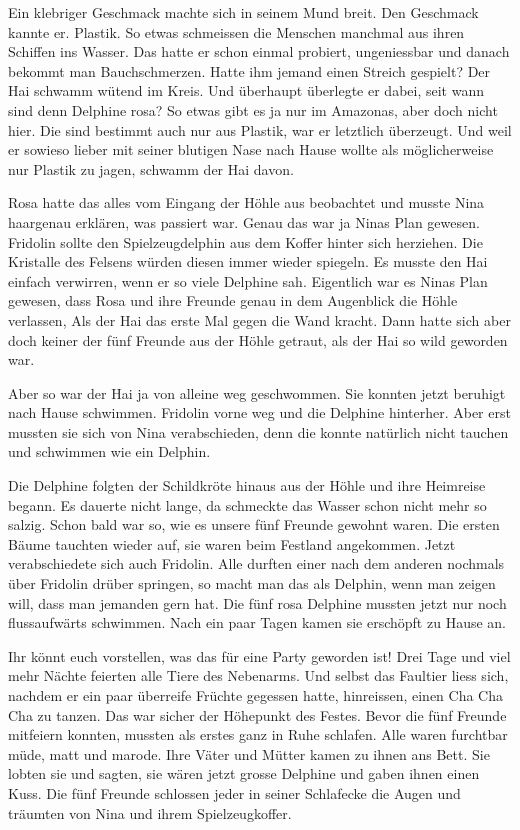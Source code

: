 Ein klebriger Geschmack machte sich in seinem Mund breit. Den Geschmack kannte er. Plastik. So etwas schmeissen die Menschen manchmal aus ihren Schiffen ins Wasser. Das hatte er schon einmal probiert, ungeniessbar und danach bekommt man Bauchschmerzen. Hatte ihm jemand einen Streich gespielt? Der Hai schwamm wütend im Kreis. Und überhaupt überlegte er dabei, seit wann sind denn Delphine rosa? So etwas gibt es ja nur im Amazonas, aber doch nicht hier. Die sind bestimmt auch nur aus Plastik, war er letztlich überzeugt.  Und weil er sowieso lieber mit seiner blutigen Nase nach Hause wollte als möglicherweise nur Plastik zu jagen, schwamm der Hai davon.

Rosa hatte das alles vom Eingang der Höhle aus beobachtet und musste Nina haargenau erklären, was passiert war. Genau das war ja Ninas Plan gewesen. Fridolin sollte den Spielzeugdelphin aus dem Koffer hinter sich herziehen. Die Kristalle des Felsens würden diesen immer wieder spiegeln. Es musste den Hai einfach verwirren, wenn er so viele Delphine sah. Eigentlich war es Ninas Plan gewesen, dass Rosa und ihre Freunde genau in dem Augenblick die Höhle verlassen, Als der Hai das erste Mal gegen die Wand kracht. Dann hatte sich aber doch keiner der fünf Freunde aus der Höhle getraut, als der Hai so wild geworden war.

Aber so war der Hai ja von alleine weg geschwommen. Sie konnten jetzt beruhigt nach Hause schwimmen. Fridolin vorne weg und die Delphine hinterher. Aber erst mussten sie sich von Nina verabschieden, denn die konnte natürlich nicht tauchen und schwimmen wie ein Delphin. 

Die Delphine folgten der Schildkröte hinaus aus der Höhle und ihre Heimreise begann. Es dauerte nicht lange, da schmeckte das Wasser schon nicht mehr so salzig. Schon bald war so, wie es unsere fünf Freunde gewohnt waren. Die ersten Bäume tauchten wieder auf, sie waren beim Festland angekommen. Jetzt verabschiedete sich auch Fridolin. Alle durften einer nach dem anderen nochmals über Fridolin drüber springen, so macht man das als Delphin, wenn man zeigen will, dass man jemanden gern hat. Die fünf rosa Delphine mussten jetzt nur noch flussaufwärts schwimmen. Nach ein paar Tagen kamen sie erschöpft zu Hause an.

Ihr könnt euch vorstellen, was das für eine Party geworden ist! Drei Tage und viel mehr Nächte feierten alle Tiere des Nebenarms. Und selbst das Faultier liess sich, nachdem er ein paar überreife Früchte gegessen hatte, hinreissen, einen Cha Cha Cha zu tanzen. Das war sicher der Höhepunkt des Festes. Bevor die fünf Freunde mitfeiern konnten, mussten als erstes ganz in Ruhe schlafen. Alle waren furchtbar müde, matt und marode. Ihre Väter und Mütter kamen zu ihnen ans Bett. Sie lobten sie und sagten, sie wären jetzt grosse Delphine und gaben ihnen einen Kuss. Die fünf Freunde schlossen jeder in seiner Schlafecke die Augen und träumten von Nina und ihrem Spielzeugkoffer.

